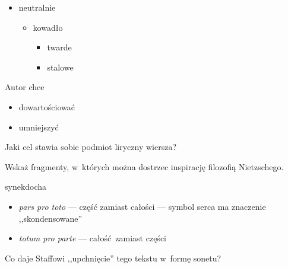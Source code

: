\begin{description}
\begin{itemize}
\begin{itemize}
                \end{itemize}
            \item neutralnie
                \begin{itemize}
                    \item kowadło
                        \begin{itemize}
                            \item twarde
                            \item stalowe
                        \end{itemize}
                \end{itemize}
        \end{itemize}
        Autor chce
        \begin{itemize}
            \item dowartościować
            \item umniejszyć
        \end{itemize}
    \item Jaki cel stawia sobie podmiot liryczny wiersza?
    \item Wskaż fragmenty, w~których można dostrzec inspirację filozofią Nietzschego.
    \item synekdocha
        \begin{itemize}
            \item \textit{pars pro toto} --- część zamiast całości --- symbol serca ma znaczenie ,,skondensowane''
            \item \textit{totum pro parte} --- całość zamiast części
        \end{itemize}
\end{description}
Co daje Staffowi ,,upchnięcie'' tego tekstu w~formę sonetu?

